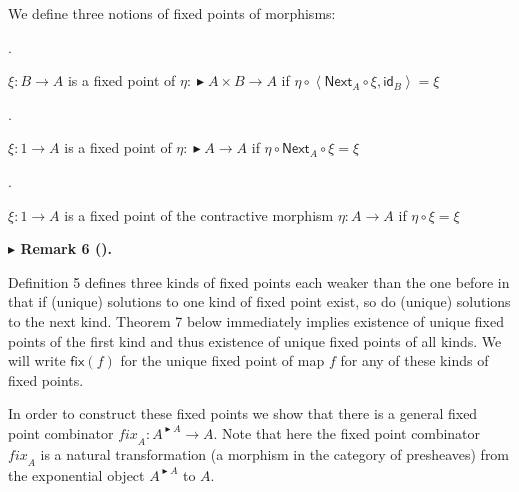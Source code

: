  
We define three notions of fixed points of morphisms:\par
  
\par{}. 
 
$\xi:B\to A$ is a fixed point of $\eta:\mathop{\blacktriangleright}{}A\times B\to A$ if $\eta\circ\left<\mathsf{Next}_{A}\circ\xi,\mathsf{id}_{B}\right>=\xi$\par
 
 
 
\par{}. 
 
$\xi:1\to A$ is a fixed point of $\eta:\mathop{\blacktriangleright}{}A\to A$ if $\eta\circ\mathsf{Next}_{A}\circ\xi=\xi$\par
 
 
 
\par{}. 
 
$\xi:1\to A$ is a fixed point of the contractive morphism $\eta:A\to A$ if $\eta\circ\xi=\xi$\par
 
 
  
 
 
 
\par\medskip\noindent\textbf{$\blacktriangleright$ Remark 6 ().}\par
 
 
Definition 5 defines three kinds of fixed points each weaker than the one before in that if (unique) solutions to one kind of fixed point exist, so do (unique) solutions to the next kind. Theorem 7 below immediately implies existence of unique fixed points of the first kind and thus existence of unique fixed points of all kinds. We will write $\mathsf{fix}(f)$ for the unique fixed point of map $f$ for any of these kinds of fixed points.\par
 
 
 
 
In order to construct these fixed points we show that there is a general fixed point combinator $\mathit{fix}_{A}:A^{\mathop{\blacktriangleright}{}A}\to A$. Note that here the fixed point combinator $\mathit{fix}_{A}$ is a natural transformation (a morphism in the category of presheaves) from the exponential object $A^{\mathop{\blacktriangleright}{}A}$ to $A$.\par
 

